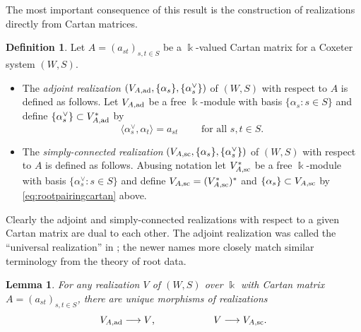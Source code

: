 \documentclass{amsart}
\theoremstyle{plain}
\newtheorem{lem}[thm]{Lemma}
\theoremstyle{definition}
\newtheorem{defn}[thm]{Definition}
\theoremstyle{remark}
\numberwithin{equation}{section}
\newcommand{\defnemph}[1]{\emph{#1}}
\begin{document}

The most important consequence of this result is the construction of realizations directly from Cartan matrices. 

\begin{defn}
Let $A=(a_{st})_{s,t \in S}$ be a $\Bbbk$-valued Cartan matrix for a Coxeter system $(W,S)$.
\begin{itemize}
\item The \defnemph{adjoint realization} $(V_{A,{\rm ad}}, \{\alpha_s\}, \{\alpha_s^\vee\})$ of $(W, S)$ with respect to $A$ is defined as follows. 
Let $V_{A,{\rm ad}}$ be a free $\Bbbk$-module with basis $\{\alpha_s : s \in S\}$ and define $\{\alpha_s^\vee\} \subset V_{A,{\rm ad}}^\ast$ by
\begin{equation}
\langle \alpha_s^\vee, \alpha_t \rangle = a_{st} \qquad \text{ for all $s,t \in S$.} \label{eq:rootpairingcartan}
\end{equation}

\item The \defnemph{simply-connected realization} $(V_{A,{\rm sc}}, \{\alpha_s\}, \{\alpha_s^\vee\})$ of $(W, S)$ with respect to $A$ is defined as follows. 
Abusing notation let $V_{A,{\rm sc}}^\ast$ be a free $\Bbbk$-module with basis $\{\alpha_s^\vee : s \in S\}$ and define $V_{A,{\rm sc}}=(V_{A,{\rm sc}}^\ast)^\ast$ and $\{\alpha_s\} \subset V_{A,{\rm sc}}$ by \eqref{eq:rootpairingcartan} above.
\end{itemize}
\end{defn}

Clearly the adjoint and simply-connected realizations with respect to a given Cartan matrix are dual to each other. 
The adjoint realization was called the ``universal realization'' in \cite[Remark~1.5]{BHN-modularWeylKac}; the newer names more closely match similar terminology from the theory of root data.

\begin{lem} \label{lem:adscuniversality}
For any realization $V$ of $(W, S)$ over $\Bbbk$ with Cartan matrix $A=(a_{st})_{s,t \in S}$, there are unique morphisms of realizations 
\begin{equation*}
V_{A,{\rm ad}} \longrightarrow V \text{,} \qquad \qquad \qquad  V \longrightarrow V_{A,{\rm sc}} \text{.}
\end{equation*}
\end{lem}
\end{document}
